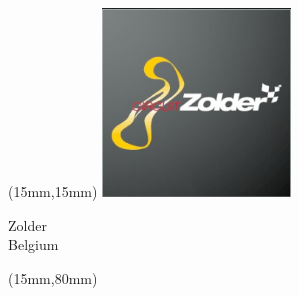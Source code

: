 \begin{textblock*}{50mm}(15mm,15mm)%
\includegraphics[width=50mm]{LG/2015-05-20_00100.png}
\par Zolder\\ Belgium
\end{textblock*}
\begin{textblock*}{185mm}(15mm,80mm)%
\end{textblock*}

